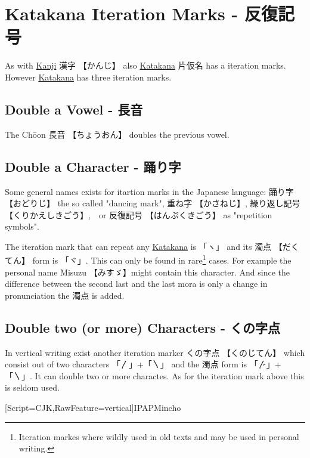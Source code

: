 \section{Katakana Iteration Marks - 反復記号 } \label{sec:Iteration}

As with \hyperref[sec:Kanji]{Kanji} {漢字} {【かんじ】} also
\hyperref[sec:Katakana]{Katakana} {片仮名} has a iteration marks.  However
\hyperref[sec:Katakana]{Katakana} has three iteration marks. 

\subsection*{Double a Vowel - 長音}

The Chōon {長音} {【ちょうおん】} doubles the previous vowel.

\subsection*{Double a Character - 踊り字}

Some general names exists for itartion marks in the Japanese language: {踊り字}
{【おどりじ】} the so called  "dancing mark", {重ね字} {【かさねじ】},
{繰り返し記号} {【くりかえしきごう】},　or {反復記号} {【はんぷくきごう】} as
"repetition symbols".

The iteration mark that can repeat any \hyperref[sec:Katakana]{Katakana} is
{「ヽ」}  and its {濁点} {【だくてん】} form is {「ヾ」}. This can only be
found in rare\footnote{Iteration markes where wildly used in old texts and may
be used in personal writing.} cases. For example the personal name Misuzu
【みすゞ】might contain this character. And since the difference between the
second last and the last mora is only a change in pronunciation the {濁点} is
added.

\subsection*{Double two (or more) Characters - くの字点}

In vertical writing exist another iteration marker {くの字点} {【くのじてん】}
which consist out of two characters {「〳」+「〵」} and the {濁点} form is
{「〴」+「〵」}. It can double two or more charactes. As for the iteration mark
above this is seldom used.

\begin{center}
[Script=CJK,RawFeature=vertical]{IPAPMincho}
\renewcommand{\rubysep}{-0.5ex}
\rotatebox{-90}{
\begin{minipage}{3.0cm} \CJKfamily{cjk-vert}
\Huge \ruby{所々}{ところ〴〵}
\end{minipage}
}
\end{center}
\bigskip

